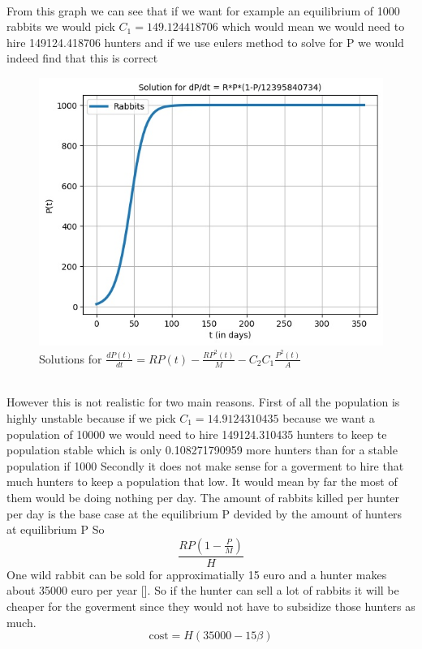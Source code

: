 \documentclass{article}
\begin{document}
\\
From this graph we can see that if we want for example an equilibrium of 1000 rabbits we would pick $C_1 = 149.124418706$ which would mean we would need to hire 149124.418706 hunters and if we use eulers method to solve for P we would indeed find that this is correct
\\
\begin{figure}[h!]
	\centering
	\includegraphics[scale=0.5]{Pictures/1000H}
	\caption{Solutions for $\frac{dP(t)}{dt} = RP(t)-\frac{RP^2(t)}{M} - C_2 C_1 \frac{P^2(t)}{A}$ }
	\label{fig:1000H}
\end{figure}
\\
However this is not realistic for two main reasons. First of all the population is highly unstable because if we pick $C_1 = 14.9124310435$ because we want a population of 10000 we would need to hire 149124.310435 hunters to keep te population stable which is only 0.108271790959 more hunters than for a stable population if 1000 Secondly it does not make sense for a goverment to hire that much hunters to keep a population that low. It would mean by far the most of them would be doing nothing per day.
The amount of rabbits killed per hunter per day is the base case at the equilibrium P devided by the amount of hunters at equilibrium P So
$$\frac{RP(1-\frac{P}{M})}{H}$$
One wild rabbit can be sold for approximatially 15 euro and a hunter makes about 35000 euro per year [\cite{MoneyHunting}]. So if the hunter can sell a lot of rabbits it will be cheaper for the goverment since they would not have to subsidize those hunters as much. 
$$\text{cost} = H(35000 -15\beta) $$
\end{document}
